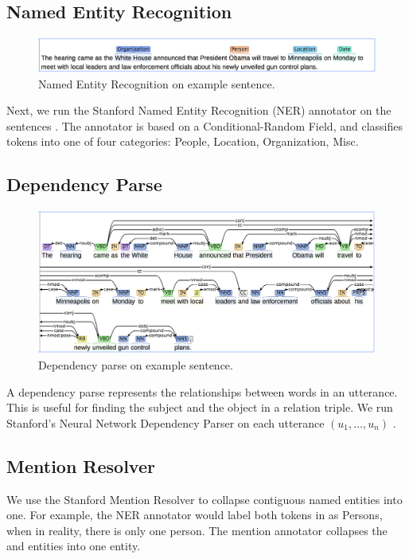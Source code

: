 \subsection{Named Entity Recognition}

\begin{figure}
\includegraphics[scale=0.33]{figures/ner.png}
\caption{
\label{fig:ner}
Named Entity Recognition on example sentence.
}
\end{figure}

Next, we run the Stanford Named Entity Recognition (NER)
annotator on the sentences \citep{finkel2005incorporating}. The annotator is
based on a Conditional-Random Field, and
classifies tokens into one of four categories: People, Location, Organization, Misc.

\subsection{Dependency Parse}

\begin{figure}
\includegraphics[scale=0.33]{figures/dep.png}
\caption{
\label{fig:dep}
Dependency parse on example sentence.
}
\end{figure}

A dependency parse represents the relationships between words
in an utterance. This is useful for finding the subject and 
the object in a relation triple. We run Stanford's Neural 
Network Dependency Parser on each utterance $(u_1,\dots,u_n)$
\citep{chen2014nndep}.
\subsection{Mention Resolver}
We use the Stanford Mention Resolver to collapse contiguous
named entities into one. For example, the NER annotator would
label both tokens in  as Persons, when in reality,
there is only one person. The mention annotator collapses the
 and  entities into one entity.

